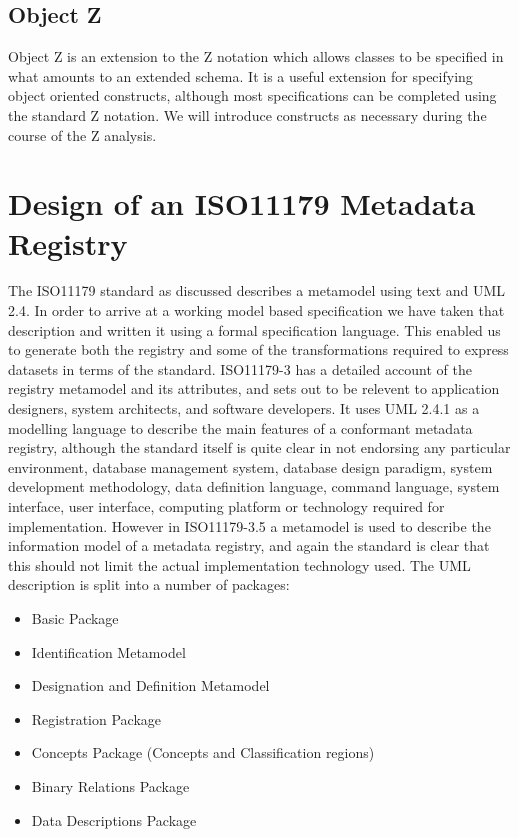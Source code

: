 \documentclass{llncs}
\begin{document}
\subsection{Object Z}
Object Z is an extension to the Z notation which allows classes to be specified in what amounts to an extended schema. It is a useful extension for specifying object oriented constructs, although most specifications can be completed using the standard Z notation. We will introduce constructs as necessary during the course of the Z analysis. 





\section{Design of an ISO11179 Metadata Registry}

The ISO11179 standard as discussed describes a metamodel using text and UML 2.4. In order to arrive at a working model based specification we have taken that description and written it using a formal specification language.  This enabled us to generate both the registry and some of the transformations required to express datasets in terms of the standard.  ISO11179-3 has a detailed account of the registry metamodel and its attributes, and sets out to be relevent to application designers, system architects, and software developers. It uses UML 2.4.1 as a modelling language to describe the main features of a conformant metadata registry, although the standard itself is quite clear in not endorsing any particular environment, database management system, database design paradigm, system development methodology, data definition language, command language, system interface, user interface, computing platform or technology required for implementation. However in ISO11179-3.5 a metamodel is used to describe the information model of a metadata registry, and again the standard is clear that this should not limit the actual implementation technology used. The UML description is split into a number of packages:
\begin{itemize}
\item Basic Package
\item Identification Metamodel
\item Designation and Definition Metamodel
\item Registration Package
\item Concepts Package (Concepts and Classification regions)
\item Binary Relations Package
\item Data Descriptions Package
\end{itemize}
\end{document}
